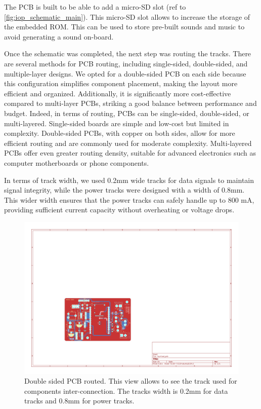 The PCB is built to be able to add a micro-SD slot (ref to \ref{fig:iop_schematic_main}). This micro-SD slot
allows to increase the storage of the embedded ROM. This can be used to store pre-built sounds and music to avoid generating a sound on-board.  


Once the schematic was completed, the next step was routing the tracks. There are several methods for PCB routing, including single-sided, double-sided, and multiple-layer designs. We opted for a double-sided PCB on each side because this configuration simplifies component placement, making the layout more efficient and organized. Additionally, it is significantly more cost-effective compared to multi-layer PCBs, striking a good balance between performance and budget. Indeed, in terms of routing, PCBs can be single-sided, double-sided, or multi-layered. Single-sided boards are simple and low-cost but limited in complexity. Double-sided PCBs, with copper on both sides, allow for more efficient routing and are commonly used for moderate complexity. Multi-layered PCBs offer even greater routing density, suitable for advanced electronics such as computer motherboards or phone components.

In terms of track width, we used 0.2mm wide tracks for data signals to maintain signal integrity, while the power tracks were designed with a width of 0.8mm. This wider width ensures that the power tracks can safely handle up to 800 mA, providing sufficient current capacity without overheating or voltage drops.

\begin{figure}[H]
    \centering
    \includegraphics[width=\textwidth]{images/iop-routed_pcb.pdf}
    \caption{Double sided PCB routed. This view allows to see the track used for components inter-connection. The tracks width is 0.2mm for data tracks and 0.8mm for power tracks.} 
    \vspace{0.1cm}
    \label{fig:iop_routed_pcb}
\end{figure}

